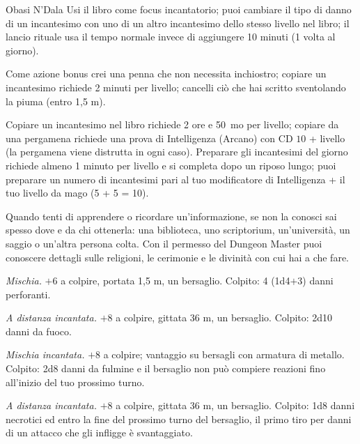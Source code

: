 \documentclass[letterpaper,twocolumn,openany,nodeprecatedcode,justified]{dndbook}
\begin{document}
\begin{DndMonster}{Obasi N'Dala}
  Usi il libro come focus incantatorio; puoi cambiare il tipo di danno di
  un incantesimo con uno di un altro incantesimo dello stesso livello nel
  libro; il lancio rituale usa il tempo normale invece di aggiungere 10
  minuti (1 volta al giorno).

  Come azione bonus crei una penna che non necessita inchiostro; copiare
  un incantesimo richiede 2 minuti per livello; cancelli ciò che hai
  scritto sventolando la piuma (entro 1,5 m).

  Copiare un incantesimo nel libro richiede 2 ore e 50~mo per livello;
  copiare da una pergamena richiede una prova di Intelligenza (Arcano)
  con CD $10$ + livello (la pergamena viene distrutta in ogni caso).
  Preparare gli incantesimi del giorno richiede almeno 1 minuto per
  livello e si completa dopo un riposo lungo; puoi preparare un numero di
  incantesimi pari al tuo modificatore di Intelligenza + il tuo livello
  da mago (5 + 5 = 10).

  Quando tenti di apprendere o ricordare un'informazione, se non la
  conosci sai spesso dove e da chi ottenerla: una biblioteca, uno
  scriptorium, un'università, un saggio o un'altra persona colta. Con il
  permesso del Dungeon Master puoi conoscere dettagli sulle religioni,
  le cerimonie e le divinità con cui hai a che fare.


  \textit{Mischia.} $+6$ a colpire, portata 1,5 m, un bersaglio. Colpito:
  4 (1d4$+3$) danni perforanti.

  \textit{A distanza incantata.} $+8$ a colpire, gittata 36 m, un
  bersaglio. Colpito: 2d10 danni da fuoco.

  \textit{Mischia incantata.} $+8$ a colpire; vantaggio su bersagli con
  armatura di metallo. Colpito: 2d8 danni da fulmine e il bersaglio non
  può compiere reazioni fino all'inizio del tuo prossimo turno.

  \textit{A distanza incantata.} $+8$ a colpire, gittata 36 m, un
  bersaglio. Colpito: 1d8 danni necrotici ed entro la fine del prossimo
  turno del bersaglio, il primo tiro per danni di un attacco che gli
  infligge è svantaggiato.


\end{DndMonster}
\end{document}
